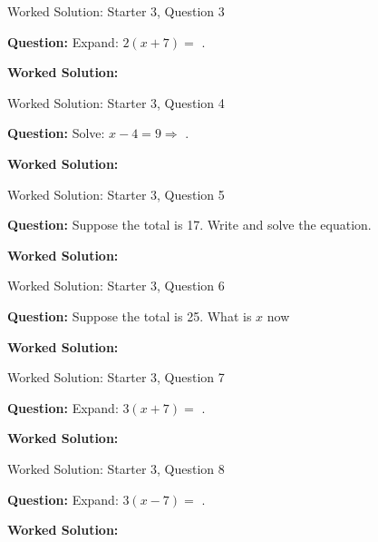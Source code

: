 \documentclass{beamer}
\newcommand{\ablank}[1]{%
  \alt<2>{\textcolor{red}{#1}}{\underline{\phantom{#1}}}%
}
\newcommand{\ashow}[1]{\uncover<2->{\textcolor{red}{\small #1}}}
\newcommand{\ashowq}[1]{\alt<2->{\textcolor{red}{\small #1}}{?}}
\begin{document}
\begin{frame}{Worked Solution: Starter 3, Question 3}

\textbf{Question:} Expand: $2(x+7)=$\ablank{$2x+14$}.

\textbf{Worked Solution:} \ashow{Multiply each term by $2$: $2(x+7)=2x+14$.}

\end{frame}

\begin{frame}{Worked Solution: Starter 3, Question 4}

\textbf{Question:} Solve: $x-4=9 \Rightarrow$\ablank{$x=13$}.

\textbf{Worked Solution:} \ashow{Add $4$ to both sides: $x=9+4=13$.}

\end{frame}

\begin{frame}{Worked Solution: Starter 3, Question 5}

\textbf{Question:} Suppose the total is 17. Write and solve the equation.

\textbf{Worked Solution:} \ashow{The model has two $x$-blocks and a $5$-block, so $2x+5=17$. Subtract $5$: $2x=12$, so $x=6$.}

\end{frame}

\begin{frame}{Worked Solution: Starter 3, Question 6}

\textbf{Question:} Suppose the total is 25. What is $x$ now\ashowq{~$x=10$.}

\textbf{Worked Solution:} \ashow{Now $2x+5=25$. Subtract $5$: $2x=20$, so $x=10$.}

\end{frame}

\begin{frame}{Worked Solution: Starter 3, Question 7}

\textbf{Question:} Expand: $3(x+7)=$\ablank{$3x+21$}.

\textbf{Worked Solution:} \ashow{$3(x+7)=3x+21$.}

\end{frame}

\begin{frame}{Worked Solution: Starter 3, Question 8}

\textbf{Question:} Expand: $3(x-7)=$\ablank{$3x-21$}.

\textbf{Worked Solution:} \ashow{$3(x-7)=3x+3(-7)=3x-21$.}

\end{frame}
\end{document}
